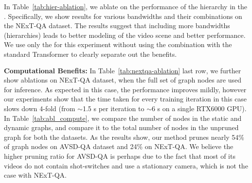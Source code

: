 \documentclass[letterpaper]{article}
\begin{document}
In Table~\ref{tab:hier-ablation}, we ablate on the performance of the hierarchy in the \nameTxr. Specifically, we show results for various bandwidths and their combinations on the NExT-QA dataset. The results suggest that including more bandwidths (hierarchies) leads to better modeling of the video scene and better performance. We use only the \nameTxr for this experiment without using the combination with the standard Transformer to clearly separate out the benefits.

\noindent\textbf{Computational Benefits:} In Table~\ref{tab:nextqa-ablation} last row, we further show ablations on NExT-QA dataset, when the full set of graph nodes are used for inference. As expected in this case, the performance improves mildly, however our experiments show that the time taken for every training iteration in this case slows down 4-fold (from $\sim$1.5 s per iteration to $\sim$6 s on a single RTX6000 GPU). In Table~\ref{tab:abl_compute}, we compare the number of nodes in the static and dynamic graphs, and compare it to the total number of nodes in the unpruned graph for both the datasets. As the results show, our method prunes nearly 54\% of graph nodes on AVSD-QA dataset and 24\% on NExT-QA. We believe the higher pruning ratio for AVSD-QA is perhaps due to the fact that most of its videos do not contain shot-switches and use a stationary camera, which is not the case with NExT-QA.
\end{document}
